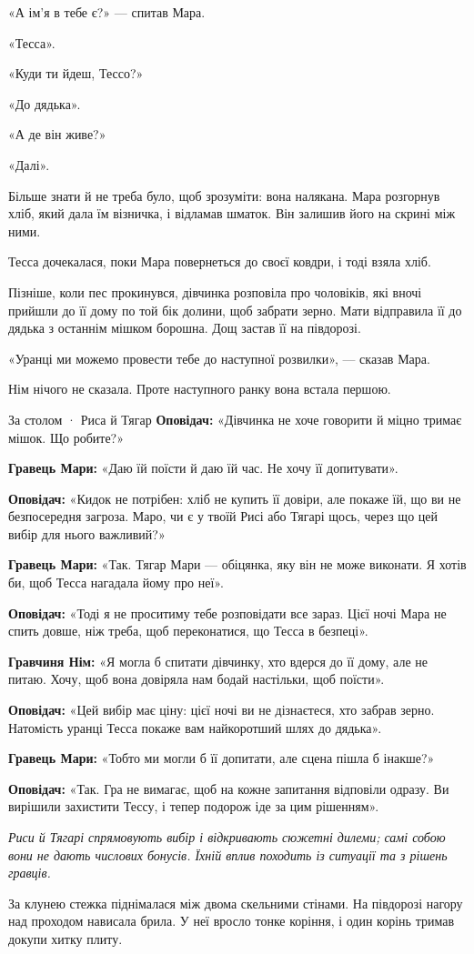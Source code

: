 \documentclass[10pt,a4paper]{article}
\begin{document}
«А ім’я в тебе є?» --- спитав Мара.

«Тесса».

«Куди ти йдеш, Тессо?»

«До дядька».

«А де він живе?»

«Далі».

Більше знати й не треба було, щоб зрозуміти: вона налякана. Мара розгорнув хліб, який дала їм візничка, і відламав шматок. Він залишив його на скрині між ними.

Тесса дочекалася, поки Мара повернеться до своєї ковдри, і тоді взяла хліб.

Пізніше, коли пес прокинувся, дівчинка розповіла про чоловіків, які вночі прийшли до її дому по той бік долини, щоб забрати зерно. Мати відправила її до дядька з останнім мішком борошна. Дощ застав її на півдорозі.

«Уранці ми можемо провести тебе до наступної розвилки», --- сказав Мара.

Нім нічого не сказала. Проте наступного ранку вона встала першою.
\begin{rpgexample}{За столом · Риса й Тягар}
\textbf{Оповідач:} «Дівчинка не хоче говорити й міцно тримає мішок. Що робите?»

\textbf{Гравець Мари:} «Даю їй поїсти й даю їй час. Не хочу її допитувати».

\textbf{Оповідач:} «Кидок не потрібен: хліб не купить її довіри, але покаже їй, що ви не безпосередня загроза. Маро, чи є у твоїй Рисі або Тягарі щось, через що цей вибір для нього важливий?»

\textbf{Гравець Мари:} «Так. Тягар Мари --- обіцянка, яку він не може виконати. Я хотів би, щоб Тесса нагадала йому про неї».

\textbf{Оповідач:} «Тоді я не проситиму тебе розповідати все зараз. Цієї ночі Мара не спить довше, ніж треба, щоб переконатися, що Тесса в безпеці».

\textbf{Гравчиня Нім:} «Я могла б спитати дівчинку, хто вдерся до її дому, але не питаю. Хочу, щоб вона довіряла нам бодай настільки, щоб поїсти».

\textbf{Оповідач:} «Цей вибір має ціну: цієї ночі ви не дізнаєтеся, хто забрав зерно. Натомість уранці Тесса покаже вам найкоротший шлях до дядька».

\textbf{Гравець Мари:} «Тобто ми могли б її допитати, але сцена пішла б інакше?»

\textbf{Оповідач:} «Так. Гра не вимагає, щоб на кожне запитання відповіли одразу. Ви вирішили захистити Тессу, і тепер подорож іде за цим рішенням».

\emph{Риси й Тягарі спрямовують вибір і відкривають сюжетні дилеми; самі собою вони не дають числових бонусів. Їхній вплив походить із ситуації та з рішень гравців.}

\end{rpgexample}
За клунею стежка піднімалася між двома скельними стінами. На півдорозі нагору над проходом нависала брила. У неї вросло тонке коріння, і один корінь тримав докупи хитку плиту.
\end{document}
